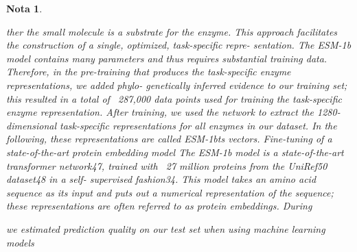\documentclass[12pt]{article}
\newtheorem{Note}{Nota}%
\begin{document}
\begin{Note}
\begin{itemize}
ther the small molecule is a substrate for the enzyme. This approach
facilitates the construction of a single, optimized, task-speciﬁc repre-
sentation. The ESM-1b model contains many parameters and thus
requires substantial training data. Therefore, in the pre-training that
produces the task-speciﬁc enzyme representations, we added phylo-
genetically inferred evidence to our training set; this resulted in a total
of ~287,000 data points used for training the task-speciﬁc enzyme
representation. After training, we used the network to extract the
1280-dimensional task-speciﬁc representations for all enzymes in our
dataset. In the following, these representations are called ESM-1bts
vectors.
Fine-tuning of a state-of-the-art protein embedding model
The ESM-1b model is a state-of-the-art transformer network47, trained
with ~27 million proteins from the UniRef50 dataset48 in a self-
supervised fashion34. This model takes an amino acid sequence as its
input and puts out a numerical representation of the sequence; these
representations are often referred to as protein embeddings. During

we estimated
prediction quality on our test set when using machine learning models


\end{itemize}
\end{Note}
\end{document}
